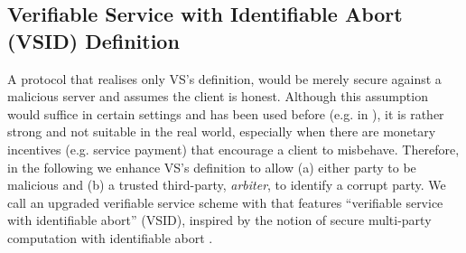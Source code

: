 


\subsection{Verifiable Service with Identifiable Abort (VSID) Definition}\label{subsec:VSID}


A protocol that realises only VS's definition, would be merely secure against a malicious server and  assumes the client is honest.  Although this  assumption would suffice in certain settings and has been used before (e.g. in \cite{}), it is rather strong and not suitable in the real world, especially when there are monetary incentives (e.g. service payment)  that encourage a client to misbehave. Therefore, in the following we enhance VS's definition to allow  (a) either party to be malicious and (b) a trusted third-party, \emph{arbiter}, to identify a corrupt party. We call an upgraded verifiable service scheme with that features ``verifiable service with identifiable abort'' (VSID), inspired by the notion of secure multi-party computation with identifiable abort \cite{DBLP:conf/crypto/IshaiOZ14}. 




\



